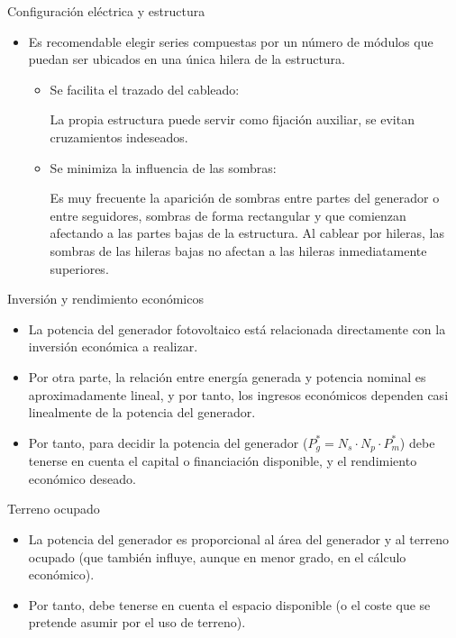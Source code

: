 \documentclass[aspectratio=169, usenames,svgnames,dvipsnames]{beamer}
\begin{document}
\begin{frame}[label={sec:org2bbf91d}]{Configuración eléctrica y estructura}
\begin{itemize}
\item Es recomendable elegir \alert{series} compuestas por un número de módulos
que puedan ser ubicados en una \alert{única hilera de la estructura}.

\begin{itemize}
\item \alert{Se facilita el trazado del cableado}:

La propia estructura puede servir como fijación auxiliar, se
evitan cruzamientos indeseados.

\item \alert{Se minimiza la influencia de las sombras}:

Es muy frecuente la aparición de sombras entre partes del
generador o entre seguidores, sombras de forma rectangular y que
comienzan afectando a las partes bajas de la estructura. Al
cablear por hileras, las sombras de las hileras bajas no afectan
a las hileras inmediatamente superiores.
\end{itemize}
\end{itemize}
\end{frame}
\begin{frame}[label={sec:org7d64d16}]{Inversión y rendimiento económicos}
\vfill
\begin{itemize}
\item La potencia del generador fotovoltaico está relacionada directamente
con la \alert{inversión económica} a realizar.
\end{itemize}
\vfill
\begin{itemize}
\item Por otra parte, la relación entre \alert{energía generada} y potencia
nominal es aproximadamente lineal, y por tanto, los \alert{ingresos
económicos} dependen casi linealmente de la potencia del generador.
\end{itemize}
\vfill
\begin{itemize}
\item Por tanto, para decidir la potencia del generador
(\(P_{g}^{*}=N_{s}\cdot N_{p}\cdot P_{m}^{*}\)) debe tenerse en cuenta
el capital o financiación disponible, y el rendimiento económico
deseado.
\end{itemize}
\end{frame}
\begin{frame}[label={sec:orgefcb0fd}]{Terreno ocupado}
\vfill
\begin{itemize}
\item La potencia del generador es proporcional al área del generador y al \alert{terreno ocupado} (que también influye, aunque en menor grado, en el cálculo económico).
\end{itemize}
\vfill
\begin{itemize}
\item Por tanto, debe tenerse en cuenta el espacio disponible (o el coste que se pretende asumir por el uso de terreno).
\end{itemize}
\end{frame}
\end{document}
